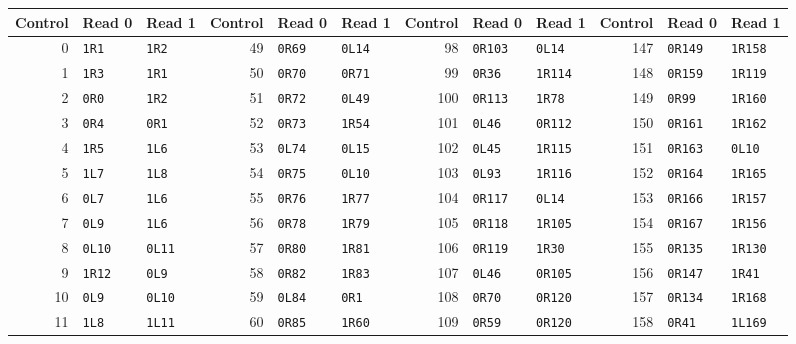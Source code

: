 \begingroup
\fontsize{9}{11}\selectfont
\setlength{\tabcolsep}{4pt}
\renewcommand{\arraystretch}{0.97}
\begin{center}
\begin{tabular}{@{}rll@{\qquad}rll@{\qquad}rll@{\qquad}rll@{}}
\toprule
Control & Read 0 & Read 1 & Control & Read 0 & Read 1 & Control & Read 0 & Read 1 & Control & Read 0 & Read 1\\\midrule
0 & \texttt{1R1} & \texttt{1R2} & 49 & \texttt{0R69} & \texttt{0L14} & 98 & \texttt{0R103} & \texttt{0L14} & 147 & \texttt{0R149} & \texttt{1R158}\\
1 & \texttt{1R3} & \texttt{1R1} & 50 & \texttt{0R70} & \texttt{0R71} & 99 & \texttt{0R36} & \texttt{1R114} & 148 & \texttt{0R159} & \texttt{1R119}\\
2 & \texttt{0R0} & \texttt{1R2} & 51 & \texttt{0R72} & \texttt{0L49} & 100 & \texttt{0R113} & \texttt{1R78} & 149 & \texttt{0R99} & \texttt{1R160}\\
3 & \texttt{0R4} & \texttt{0R1} & 52 & \texttt{0R73} & \texttt{1R54} & 101 & \texttt{0L46} & \texttt{0R112} & 150 & \texttt{0R161} & \texttt{1R162}\\
4 & \texttt{1R5} & \texttt{1L6} & 53 & \texttt{0L74} & \texttt{0L15} & 102 & \texttt{0L45} & \texttt{1R115} & 151 & \texttt{0R163} & \texttt{0L10}\\
5 & \texttt{1L7} & \texttt{1L8} & 54 & \texttt{0R75} & \texttt{0L10} & 103 & \texttt{0L93} & \texttt{1R116} & 152 & \texttt{0R164} & \texttt{1R165}\\
6 & \texttt{0L7} & \texttt{1L6} & 55 & \texttt{0R76} & \texttt{1R77} & 104 & \texttt{0R117} & \texttt{0L14} & 153 & \texttt{0R166} & \texttt{1R157}\\
7 & \texttt{0L9} & \texttt{1L6} & 56 & \texttt{0R78} & \texttt{1R79} & 105 & \texttt{0R118} & \texttt{1R105} & 154 & \texttt{0R167} & \texttt{1R156}\\
8 & \texttt{0L10} & \texttt{0L11} & 57 & \texttt{0R80} & \texttt{1R81} & 106 & \texttt{0R119} & \texttt{1R30} & 155 & \texttt{0R135} & \texttt{1R130}\\
9 & \texttt{1R12} & \texttt{0L9} & 58 & \texttt{0R82} & \texttt{1R83} & 107 & \texttt{0L46} & \texttt{0R105} & 156 & \texttt{0R147} & \texttt{1R41}\\
10 & \texttt{0L9} & \texttt{0L10} & 59 & \texttt{0L84} & \texttt{0R1} & 108 & \texttt{0R70} & \texttt{0R120} & 157 & \texttt{0R134} & \texttt{1R168}\\
11 & \texttt{1L8} & \texttt{1L11} & 60 & \texttt{0R85} & \texttt{1R60} & 109 & \texttt{0R59} & \texttt{0R120} & 158 & \texttt{0R41} & \texttt{1L169}\\

\end{tabular}
\end{center}
